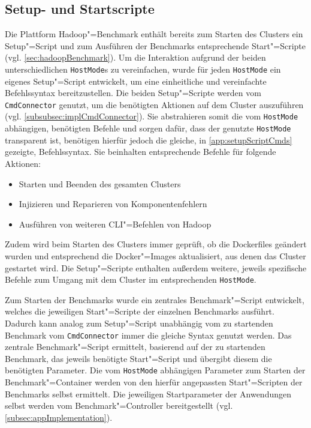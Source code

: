 \subsection{Setup- und Startscripte}
\label{subsec:scripts}

Die Plattform Hadoop"=Benchmark enthält bereits zum Starten des Clusters ein Setup"=Script und zum Ausführen der Benchmarks entsprechende Start"=Scripte (vgl. \cref{sec:hadoopBenchmark}).
Um die Interaktion aufgrund der beiden unterschiedlichen \texttt{HostMode}s zu vereinfachen, wurde für jeden \texttt{HostMode} ein eigenes Setup"=Script entwickelt, um eine einheitliche und vereinfachte Befehlssyntax bereitzustellen.
Die beiden Setup"=Scripte werden vom \texttt{CmdConnector} genutzt, um die benötigten Aktionen auf dem Cluster auszuführen (vgl. \cref{subsubsec:implCmdConnector}).
Sie abstrahieren somit die vom \texttt{HostMode} abhängigen, benötigten Befehle und sorgen dafür, dass der genutzte \texttt{HostMode} transparent ist, benötigen hierfür jedoch die gleiche, in \cref{app:setupScriptCmds} gezeigte, Befehlssyntax.
Sie beinhalten entsprechende Befehle für folgende Aktionen:

\begin{itemize}
    \item Starten und Beenden des gesamten Clusters
    \item Injizieren und Reparieren von Komponentenfehlern
    \item Ausführen von weiteren \gls{CLI}"=Befehlen von Hadoop
\end{itemize}

Zudem wird beim Starten des Clusters immer geprüft, ob die Dockerfiles geändert wurden und entsprechend die Docker"=Images aktualisiert, aus denen das Cluster gestartet wird.
Die Setup"=Scripte enthalten außerdem weitere, jeweils spezifische Befehle zum Umgang mit dem Cluster im entsprechenden \texttt{HostMode}.

Zum Starten der Benchmarks wurde ein zentrales Benchmark"=Script entwickelt, welches die jeweiligen Start"=Scripte der einzelnen Benchmarks ausführt.
Dadurch kann analog zum Setup"=Script unabhängig vom zu startenden Benchmark vom \texttt{CmdConnector} immer die gleiche Syntax genutzt werden.
Das zentrale Benchmark"=Script ermittelt, basierend auf der zu startenden Benchmark, das jeweils benötigte Start"=Script und übergibt diesem die benötigten Parameter.
Die vom \texttt{HostMode} abhängigen Parameter zum Starten der Benchmark"=Container werden von den hierfür angepassten Start"=Scripten der Benchmarks selbst ermittelt.
Die jeweiligen Startparameter der Anwendungen selbst werden vom Benchmark"=Controller bereitgestellt (vgl. \cref{subsec:appImplementation}).
